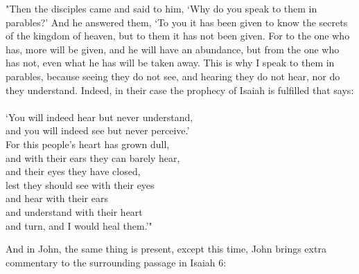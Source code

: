 \documentclass[11pt]{article}
\begin{document}
\begin{versesection}{2em}

 "Then the disciples came and said to him, `Why do you speak to them in parables?'  And he answered them, `To you it has been given to know the secrets of the kingdom of heaven, but to them it has not been given.  For to the one who has, more will be given, and he will have an abundance, but from the one who has not, even what he has will be taken away.  This is why I speak to them in parables, because seeing they do not see, and hearing they do not hear, nor do they understand.  Indeed, in their case the prophecy of Isaiah is fulfilled that says: \\\\`You will indeed hear but never understand,\\ \poetryline{} and you will indeed see but never perceive.'\\  For this people's heart has grown dull,\\ \poetryline{} and with their ears they can barely hear,\\ \poetryline{} and their eyes they have closed, \\ lest they should see with their eyes \\ \poetryline{} and hear with their ears\\ and understand with their heart\\ \poetryline{} and turn, and I would heal them.'"
\end{versesection}

{\vspace{1em}}
And in John, the same thing is present, except this time, John brings extra commentary to the surrounding passage in Isaiah 6:
\end{document}
